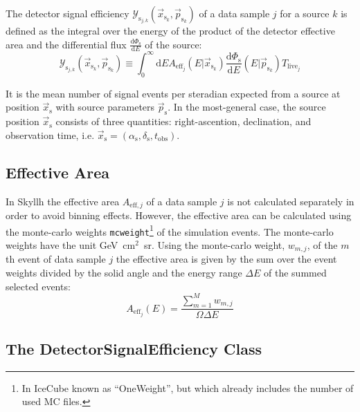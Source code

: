\documentclass{article}
\newcommand{\code}[1]{\texttt{#1}}
\newcommand{\ps}{\vec{p}_{\mathrm{s}}}
\newcommand{\psk}{\vec{p}_{\mathrm{s}_k}}
\newcommand{\xs}{\vec{x}_{\mathrm{s}}}
\newcommand{\xsk}{\vec{x}_{\mathrm{s}_k}}
\begin{document}
The detector signal efficiency $\mathcal{Y}_{\mathrm{s}_{j,k}}(\xsk,\psk)$
of a data sample $j$ for a source $k$ is defined as the integral over the energy
of the product of the detector effective area and the differential flux
$\frac{\mathrm{d}\Phi_{\mathrm{s}}}{\mathrm{d}E}$ of the source:
\begin{equation}
 \mathcal{Y}_{\mathrm{s}_{j,k}}(\xsk,\psk) \equiv \int_0^\infty \mathrm{d}E A_{\mathrm{eff}_j}(E|\xsk) \frac{\mathrm{d}\Phi_{\mathrm{s}}}{\mathrm{d}E}(E|\psk) T_{\mathrm{live}_j}
\label{eq:Ysj}
\end{equation}


It is the mean number of signal events per steradian expected from a source at
position $\xs$ with source parameters $\ps$. In the most-general case,
the source position $\xs$ consists of three quantities: right-ascention,
declination, and observation time, i.e.
$\xs = (\alpha_{\mathrm{s}},\delta_{\mathrm{s}},t_{\mathrm{obs}})$.

\subsection{Effective Area}

In Skyllh the effective area $A_{\mathrm{eff},j}$ of a data sample $j$ is not
calculated separately in order to avoid binning effects. However, the effective
area can be calculated using the monte-carlo weights \code{mcweight}\footnote{In IceCube
known as ``OneWeight'', but which already includes the number of used MC files.}
of the simulation events.
The monte-carlo weights have the unit GeV~cm$^2$~sr.
Using the monte-carlo weight, $w_{m,j}$, of the $m$th event of data sample $j$
the effective area is given by the sum over the event weights divided by the
solid angle and the energy range $\Delta E$ of the summed selected events:
\begin{equation}
 A_{\mathrm{eff}_j}(E) = \frac{\sum_{m=1}^{M} w_{m,j}}{\Omega \Delta E}
\end{equation}


\subsection{The DetectorSignalEfficiency Class}
\end{document}
